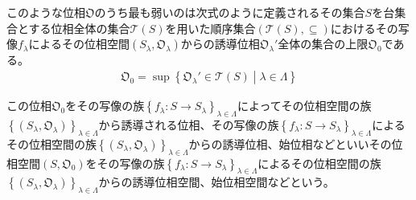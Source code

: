 \documentclass[dvipdfmx]{jsarticle}
\begin{document}
\begin{thm}\label{8.1.4.4}
このような位相$\mathfrak{O}$のうち最も弱いのは次式のように定義されるその集合$S$を台集合とする位相全体の集合$\mathcal{T}(S)$を用いた順序集合$\left( \mathcal{T}(S), \subseteq \right)$におけるその写像$f_{\lambda}$によるその位相空間$\left( S_{\lambda},\mathfrak{O}_{\lambda} \right)$からの誘導位相$\mathfrak{O}_{\lambda}'$全体の集合の上限$\mathfrak{O}_{0}$である。
\begin{align*}
\mathfrak{O}_{0} = \sup\left\{ \mathfrak{O}_{\lambda}'\in \mathcal{T}(S) \middle| \lambda \in \varLambda \right\}
\end{align*}
\end{thm}
\begin{dfn}
この位相$\mathfrak{O}_{0}$をその写像の族$\left\{ f_{\lambda}:S \rightarrow S_{\lambda} \right\}_{\lambda \in \varLambda}$によってその位相空間の族$\left\{ \left( S_{\lambda},\mathfrak{O}_{\lambda} \right) \right\}_{\lambda \in \varLambda}$から誘導される位相、その写像の族$\left\{ f_{\lambda}:S \rightarrow S_{\lambda} \right\}_{\lambda \in \varLambda}$によるその位相空間の族$\left\{ \left( S_{\lambda},\mathfrak{O}_{\lambda} \right) \right\}_{\lambda \in \varLambda}$からの誘導位相、始位相などといいその位相空間$\left( S,\mathfrak{O}_{0} \right)$をその写像の族$\left\{ f_{\lambda}:S \rightarrow S_{\lambda} \right\}_{\lambda \in \varLambda}$によるその位相空間の族$\left\{ \left( S_{\lambda},\mathfrak{O}_{\lambda} \right) \right\}_{\lambda \in \varLambda}$からの誘導位相空間、始位相空間などという。
\end{dfn}
\end{document}
